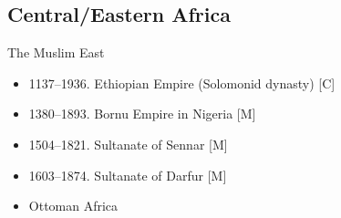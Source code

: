 \subsection{Central/Eastern Africa}
\begin{frame}{The Muslim East}
	\begin{itemize}
		\item<1-4,6>1137--1936. Ethiopian Empire (Solomonid dynasty) [C]
		\item<2-4,6>1380--1893. Bornu Empire in Nigeria [M]
		\item<3-4,6>1504--1821. Sultanate of Sennar [M]
		\item<4,6>1603--1874. Sultanate of Darfur [M]
		\item<6>Ottoman Africa
	\end{itemize}
\end{frame}

